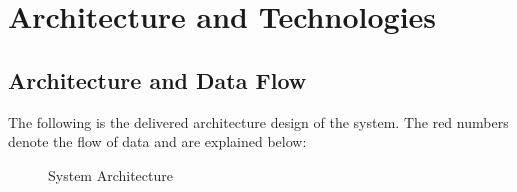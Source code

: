 \chapter{Architecture and Technologies}
\label{chap:architecture}

\section{Architecture and Data Flow}
\label{sec:architecture}
The following is the delivered architecture design of the system. The red numbers denote the flow of data
and are explained below:
\begin{figure}[H]
	\centering
	\caption{System Architecture}
	\label{fig:delivered_archi}
\end{figure}

